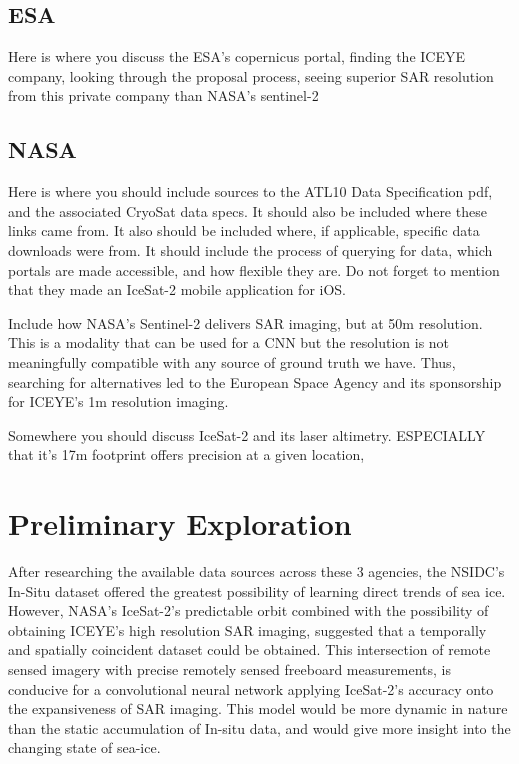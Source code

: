 \subsection*{ESA}
Here is where you discuss the ESA's copernicus portal, finding the ICEYE company, looking through the proposal process, seeing superior SAR resolution from this private company than NASA's sentinel-2

\subsection*{NASA}
Here is where you should include sources to the ATL10 Data Specification pdf, and the associated CryoSat data specs. It should also be included where these links came from. It also should be included where, if applicable, specific data downloads were from. It should include the process of querying for data, which portals are made accessible, and how flexible they are. Do not forget to mention that they made an IceSat-2 mobile application for iOS. \cite{ICESat-2-ATL10-Product}

Include how NASA's Sentinel-2 delivers SAR imaging, but at 50m resolution. This is a modality that can be used for a CNN but the resolution is not meaningfully compatible with any source of ground truth we have. Thus, searching for alternatives led to the European Space Agency and its sponsorship for ICEYE's 1m resolution imaging.

Somewhere you should discuss IceSat-2 and its laser altimetry. ESPECIALLY that it's 17m footprint offers precision at a given location, 

\section {Preliminary Exploration}
After researching the available data sources across these 3 agencies, the NSIDC's In-Situ dataset offered the greatest possibility of learning direct trends of sea ice. However, NASA's IceSat-2's predictable orbit combined with the possibility of obtaining ICEYE's high resolution SAR imaging, suggested that a temporally and spatially coincident dataset could be obtained. This intersection of remote sensed imagery with precise remotely sensed freeboard measurements, is conducive for a convolutional neural network applying IceSat-2's accuracy onto the expansiveness of SAR imaging. This model would be more dynamic in nature than the static accumulation of In-situ data, and would give more insight into the changing state of sea-ice. \cite{In-Situ-Dataset}

